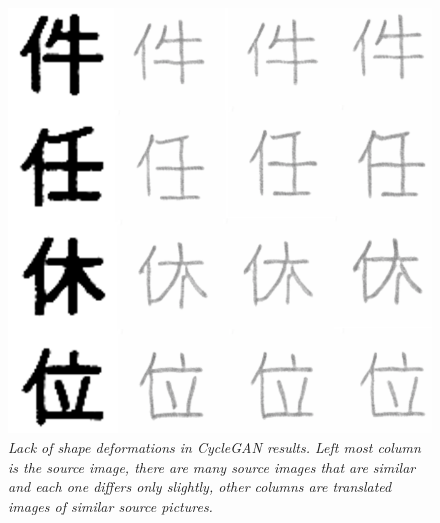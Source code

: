 \documentclass[12pt]{report}
\begin{document}
\begin{figure}[h]
	\centering
	\includegraphics[scale=0.7]{cycle-gan-result-2}
	\caption{\textit{Lack of shape deformations in CycleGAN results. Left most column is the source image, there are many source images that are similar and each one differs only slightly, other columns are translated images of similar source pictures.}}
	\label{fig:cycle-gan-result-2}
\end{figure}
\end{document}
